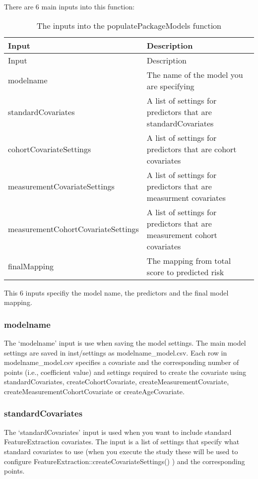 \documentclass[
]{article}
\begin{document}
There are 6 main inputs into this function:

\begin{longtable}[]{@{}ll@{}}
\caption{The inputs into the populatePackageModels
function}\tabularnewline
\toprule
Input & Description\tabularnewline
\midrule
\endfirsthead
\toprule
Input & Description\tabularnewline
\midrule
\endhead
modelname & The name of the model you are specifying\tabularnewline
standardCovariates & A list of settings for predictors that are
standardCovariates\tabularnewline
cohortCovariateSettings & A list of settings for predictors that are
cohort covariates\tabularnewline
measurementCovariateSettings & A list of settings for predictors that
are measurment covariates\tabularnewline
measurementCohortCovariateSettings & A list of settings for predictors
that are measurement cohort covariates\tabularnewline
finalMapping & The mapping from total score to predicted
risk\tabularnewline
\bottomrule
\end{longtable}

This 6 inputs specifiy the model name, the predictors and the final
model mapping.

\hypertarget{modelname}{%
\subsubsection{modelname}\label{modelname}}

The `modelname' input is use when saving the model settings. The main
model settings are saved in inst/settings as modelname\_model.csv. Each
row in modelname\_model.csv specifies a covariate and the corresponding
number of points (i.e., coefficient value) and settings required to
create the covariate using standardCovariates, createCohortCovariate,
createMeasurementCovariate, createMeasurementCohortCovariate or
createAgeCovariate.

\hypertarget{standardcovariates}{%
\subsubsection{standardCovariates}\label{standardcovariates}}

The `standardCovariates' input is used when you want to include standard
FeatureExtraction covariates. The input is a list of settings that
specify what standard covariates to use (when you execute the study
these will be used to configure
FeatureExtraction::createCovariateSettings() ) and the corresponding
points.
\end{document}
